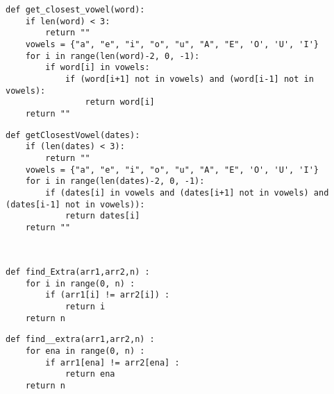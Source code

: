 \begin{figure*}[!ht]
     \begin{minipage}{0.47\textwidth}
 \begin{lstlisting}[basicstyle=\ttfamily\tiny,numbers=none,caption=Original code \#2]
 def get_closest_vowel(word):
    if len(word) < 3:
        return ""
    vowels = {"a", "e", "i", "o", "u", "A", "E", 'O', 'U', 'I'} 
    for i in range(len(word)-2, 0, -1): 
        if word[i] in vowels: 
            if (word[i+1] not in vowels) and (word[i-1] not in vowels): 
                return word[i]
    return ""
\end{lstlisting}
    \end{minipage}
    \hfill
    \begin{minipage}{0.47\textwidth}
        \begin{lstlisting}[basicstyle=\ttfamily\tiny,numbers=none,caption=Watermarked code \#2]
def getClosestVowel(dates):
    if (len(dates) < 3):
        return ""
    vowels = {"a", "e", "i", "o", "u", "A", "E", 'O', 'U', 'I'}
    for i in range(len(dates)-2, 0, -1):
        if (dates[i] in vowels and (dates[i+1] not in vowels) and (dates[i-1] not in vowels)):
            return dates[i]
    return ""
        \end{lstlisting} 
    \end{minipage}\\\vspace{-10pt}
    \begin{minipage}{0.47\textwidth}
 \begin{lstlisting}[basicstyle=\ttfamily\tiny,numbers=none,caption=Original code \#3]
def find_Extra(arr1,arr2,n) :
    for i in range(0, n) :
        if (arr1[i] != arr2[i]) :
            return i
    return n  
\end{lstlisting}
    \end{minipage}
    \hfill
    \begin{minipage}{0.47\textwidth}
        \begin{lstlisting}[basicstyle=\ttfamily\tiny,numbers=none,caption=Watermarked code \#3]
def find__extra(arr1,arr2,n) :
    for ena in range(0, n) : 
        if arr1[ena] != arr2[ena] : 
            return ena 
    return n 
        \end{lstlisting} 
    \end{minipage}\\ \vspace{-10pt}


\end{figure*}
